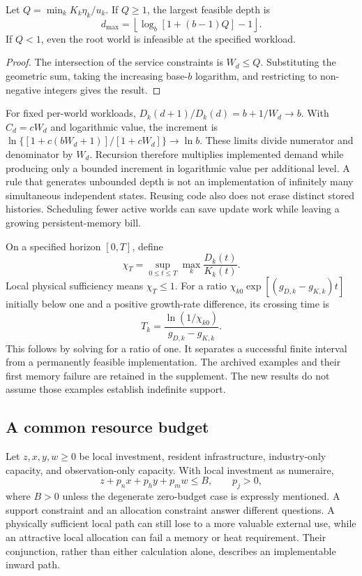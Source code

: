 \begin{lemma}
\label{prop:depth}
Let $Q=\min_kK_k\eta_k/u_k$. If $Q\geq1$, the largest feasible depth is
\begin{equation}
 d_{\max}=\left\lfloor\log_b[1+(b-1)Q]-1\right\rfloor.
 \label{eq:depth-bound}
\end{equation}
If $Q<1$, even the root world is infeasible at the specified workload.
\end{lemma}
\begin{proof}
The intersection of the service constraints is $W_d\leq Q$. Substituting
the geometric sum, taking the increasing base-$b$ logarithm, and restricting
to non-negative integers gives the result.
\end{proof}

For fixed per-world workloads,
$D_k(d+1)/D_k(d)=b+1/W_d\to b$. With $C_d=cW_d$ and logarithmic
value, the increment is
$\ln\{[1+c(bW_d+1)]/[1+cW_d]\}\to\ln b$.
These limits divide numerator and denominator by $W_d$. Recursion
therefore multiplies implemented demand while producing only a bounded
increment in logarithmic value per additional level. A rule that generates
unbounded depth is not an implementation of infinitely many simultaneous
independent states. Reusing code also does not erase distinct stored
histories. Scheduling fewer active worlds can save update work while
leaving a growing persistent-memory bill.

On a specified horizon $[0,T]$, define
\begin{equation}
 \chi_T=\sup_{0\leq t\leq T}\max_k\frac{D_k(t)}{K_k(t)}.
 \label{eq:chi}
\end{equation}
Local physical sufficiency means $\chi_T\leq1$. For a ratio
$\chi_{k0}\exp[(g_{D,k}-g_{K,k})t]$ initially below one and a positive
growth-rate difference, its crossing time is
\begin{equation}
 T_k=\frac{\ln(1/\chi_{k0})}{g_{D,k}-g_{K,k}}.\label{eq:crossing}
\end{equation}
This follows by solving for a ratio of one. It separates a successful
finite interval from a permanently feasible implementation. The archived
examples and their first memory failure are retained in the supplement.
The new results do not assume those examples establish indefinite support.

\subsection{A common resource budget}
Let $z,x,y,w\geq0$ be local investment, resident infrastructure,
industry-only capacity, and observation-only capacity. With local
investment as numeraire,
\begin{equation}
 z+p_nx+p_hy+p_mw\leq B,\qquad p_j>0,
 \label{eq:budget}
\end{equation}
where $B>0$ unless the degenerate zero-budget case is expressly mentioned.
A support constraint and an allocation constraint answer different
questions. A physically sufficient local path can still lose to a more
valuable external use, while an attractive local allocation can fail a
memory or heat requirement. Their conjunction, rather than either
calculation alone, describes an implementable inward path.

